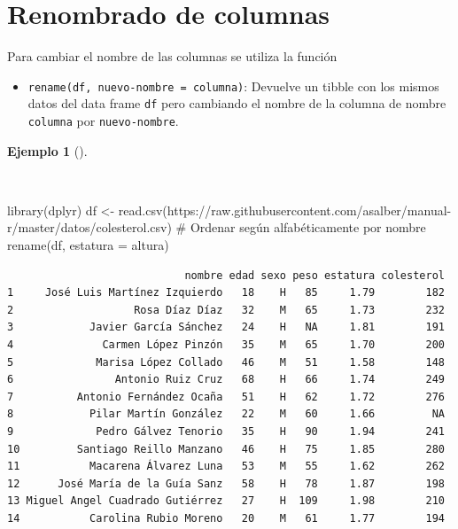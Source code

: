 \documentclass[
  spanish,
  a4paper,
]{scrreport}
\newenvironment{Shaded}{\begin{snugshade}}{\end{snugshade}}
\newcommand{\AttributeTok}[1]{\textcolor[rgb]{0.40,0.45,0.13}{#1}}
\newcommand{\CommentTok}[1]{\textcolor[rgb]{0.37,0.37,0.37}{#1}}
\newcommand{\FunctionTok}[1]{\textcolor[rgb]{0.28,0.35,0.67}{#1}}
\newcommand{\NormalTok}[1]{\textcolor[rgb]{0.00,0.23,0.31}{#1}}
\newcommand{\OtherTok}[1]{\textcolor[rgb]{0.00,0.23,0.31}{#1}}
\newcommand{\StringTok}[1]{\textcolor[rgb]{0.13,0.47,0.30}{#1}}
\providecommand{\tightlist}{%
  \setlength{\itemsep}{0pt}\setlength{\parskip}{0pt}}
\theoremstyle{definition}
\theoremstyle{definition}
\newtheorem{example}{Ejemplo}[chapter]
\theoremstyle{remark}
\begin{document}
\section{Renombrado de columnas}\label{renombrado-de-columnas}

Para cambiar el nombre de las columnas se utiliza la función

\begin{itemize}
\tightlist
\item
  \texttt{rename(df,\ nuevo-nombre\ =\ columna)}: Devuelve un tibble con
  los mismos datos del data frame \texttt{df} pero cambiando el nombre
  de la columna de nombre \texttt{columna} por \texttt{nuevo-nombre}.
\end{itemize}

\begin{example}[]\protect\hypertarget{exm-rename}{}\label{exm-rename}

~

\begin{Shaded}
\begin{Highlighting}[]
\FunctionTok{library}\NormalTok{(dplyr)}
\NormalTok{df }\OtherTok{\textless{}{-}} \FunctionTok{read.csv}\NormalTok{(}\StringTok{\textquotesingle{}https://raw.githubusercontent.com/asalber/manual{-}r/master/datos/colesterol.csv\textquotesingle{}}\NormalTok{)}
\CommentTok{\# Ordenar según alfabéticamente por nombre}
\FunctionTok{rename}\NormalTok{(df, }\AttributeTok{estatura =}\NormalTok{ altura)}
\end{Highlighting}
\end{Shaded}

\begin{verbatim}
                            nombre edad sexo peso estatura colesterol
1     José Luis Martínez Izquierdo   18    H   85     1.79        182
2                   Rosa Díaz Díaz   32    M   65     1.73        232
3            Javier García Sánchez   24    H   NA     1.81        191
4              Carmen López Pinzón   35    M   65     1.70        200
5             Marisa López Collado   46    M   51     1.58        148
6                Antonio Ruiz Cruz   68    H   66     1.74        249
7          Antonio Fernández Ocaña   51    H   62     1.72        276
8            Pilar Martín González   22    M   60     1.66         NA
9             Pedro Gálvez Tenorio   35    H   90     1.94        241
10         Santiago Reillo Manzano   46    H   75     1.85        280
11           Macarena Álvarez Luna   53    M   55     1.62        262
12      José María de la Guía Sanz   58    H   78     1.87        198
13 Miguel Angel Cuadrado Gutiérrez   27    H  109     1.98        210
14           Carolina Rubio Moreno   20    M   61     1.77        194
\end{verbatim}

\end{example}
\end{document}
